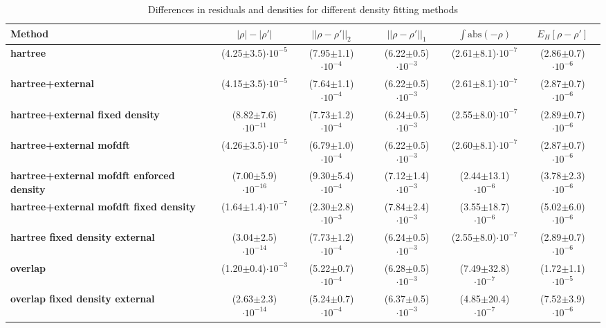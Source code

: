 \begin{table}[ht]
\centering
\begin{tabular}{p{2cm}|c|c|c|c|c}
\textbf{Method} & $|\rho|-|\rho'|$ & $||\rho-\rho'||_2$ & $||\rho-\rho'||_1$ & $\int \text{abs}(-\rho)$ & $E_H[\rho-\rho']$ \\
\hline
\raggedright \textbf{hartree} & (4.25$\pm$3.5)$\cdot 10^{-5}$ & (7.95$\pm$1.1)$\cdot 10^{-4}$ & (6.22$\pm$0.5)$\cdot 10^{-3}$ & (2.61$\pm$8.1)$\cdot 10^{-7}$ & (2.86$\pm$0.7)$\cdot 10^{-6}$ \\
\raggedright \textbf{hartree+external} & (4.15$\pm$3.5)$\cdot 10^{-5}$ & (7.64$\pm$1.1)$\cdot 10^{-4}$ & (6.22$\pm$0.5)$\cdot 10^{-3}$ & (2.61$\pm$8.1)$\cdot 10^{-7}$ & (2.87$\pm$0.7)$\cdot 10^{-6}$ \\
\raggedright \textbf{hartree+external fixed density} & (8.82$\pm$7.6)$\cdot 10^{-11}$ & (7.73$\pm$1.2)$\cdot 10^{-4}$ & (6.24$\pm$0.5)$\cdot 10^{-3}$ & (2.55$\pm$8.0)$\cdot 10^{-7}$ & (2.89$\pm$0.7)$\cdot 10^{-6}$ \\
\raggedright \textbf{hartree+external mofdft} & (4.26$\pm$3.5)$\cdot 10^{-5}$ & (6.79$\pm$1.0)$\cdot 10^{-4}$ & (6.22$\pm$0.5)$\cdot 10^{-3}$ & (2.60$\pm$8.1)$\cdot 10^{-7}$ & (2.87$\pm$0.7)$\cdot 10^{-6}$ \\
\raggedright \textbf{hartree+external mofdft enforced density} & (7.00$\pm$5.9)$\cdot 10^{-16}$ & (9.30$\pm$5.4)$\cdot 10^{-4}$ & (7.12$\pm$1.4)$\cdot 10^{-3}$ & (2.44$\pm$13.1)$\cdot 10^{-6}$ & (3.78$\pm$2.3)$\cdot 10^{-6}$ \\
\raggedright \textbf{hartree+external mofdft fixed density} & (1.64$\pm$1.4)$\cdot 10^{-7}$ & (2.30$\pm$2.8)$\cdot 10^{-3}$ & (7.84$\pm$2.4)$\cdot 10^{-3}$ & (3.55$\pm$18.7)$\cdot 10^{-6}$ & (5.02$\pm$6.0)$\cdot 10^{-6}$ \\
\raggedright \textbf{hartree fixed density external} & (3.04$\pm$2.5)$\cdot 10^{-14}$ & (7.73$\pm$1.2)$\cdot 10^{-4}$ & (6.24$\pm$0.5)$\cdot 10^{-3}$ & (2.55$\pm$8.0)$\cdot 10^{-7}$ & (2.89$\pm$0.7)$\cdot 10^{-6}$ \\
\raggedright \textbf{overlap} & (1.20$\pm$0.4)$\cdot 10^{-3}$ & (5.22$\pm$0.7)$\cdot 10^{-4}$ & (6.28$\pm$0.5)$\cdot 10^{-3}$ & (7.49$\pm$32.8)$\cdot 10^{-7}$ & (1.72$\pm$1.1)$\cdot 10^{-5}$ \\
\raggedright \textbf{overlap fixed density external} & (2.63$\pm$2.3)$\cdot 10^{-14}$ & (5.24$\pm$0.7)$\cdot 10^{-4}$ & (6.37$\pm$0.5)$\cdot 10^{-3}$ & (4.85$\pm$20.4)$\cdot 10^{-7}$ & (7.52$\pm$3.9)$\cdot 10^{-6}$ \\
\end{tabular}
\caption{Differences in residuals and densities for different density fitting methods}
\end{table}

